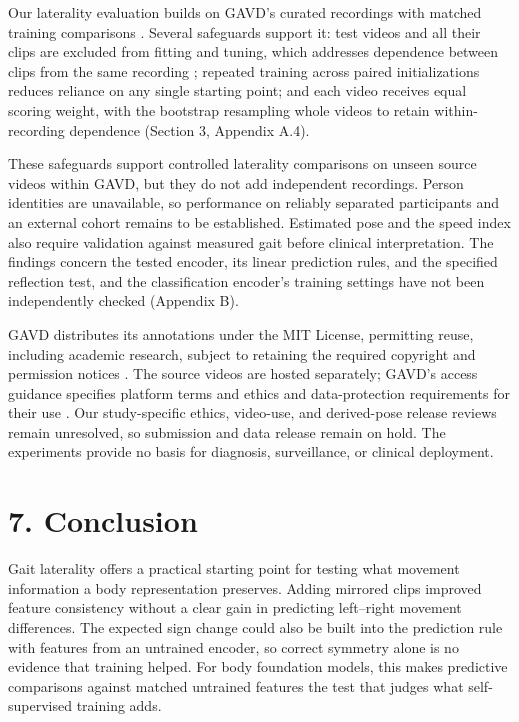 \documentclass{article}
\begin{document}
Our laterality evaluation builds on GAVD's curated recordings with
matched training comparisons \citep{ranjan2025gavd}. Several safeguards
support it: test videos and all their clips are excluded from fitting
and tuning, which addresses dependence between clips from the same
recording \citep{roberts2017crossvalidation}; repeated training across
paired initializations reduces reliance on any single starting point;
and each video receives equal scoring weight, with the bootstrap
resampling whole videos to retain within-recording dependence (Section
3, Appendix A.4).

These safeguards support controlled laterality comparisons on unseen
source videos within GAVD, but they do not add independent recordings.
Person identities are unavailable, so performance on reliably separated
participants and an external cohort remains to be established. Estimated
pose and the speed index also require validation against measured gait
before clinical interpretation. The findings concern the tested encoder,
its linear prediction rules, and the specified reflection test, and the
classification encoder's training settings have not been independently
checked (Appendix B).

GAVD distributes its annotations under the MIT License, permitting
reuse, including academic research, subject to retaining the required
copyright and permission notices \citep{gavdMIT2026}. The source videos
are hosted separately; GAVD's access guidance specifies platform terms
and ethics and data-protection requirements for their use
\citep{gavdRepo2026}. Our study-specific ethics, video-use, and
derived-pose release reviews remain unresolved, so submission and data
release remain on hold. The experiments provide no basis for diagnosis,
surveillance, or clinical deployment.

\section{7. Conclusion}\label{conclusion}

Gait laterality offers a practical starting point for testing what
movement information a body representation preserves. Adding mirrored
clips improved feature consistency without a clear gain in predicting
left--right movement differences. The expected sign change could also be
built into the prediction rule with features from an untrained encoder,
so correct symmetry alone is no evidence that training helped. For body
foundation models, this makes predictive comparisons against matched
untrained features the test that judges what self-supervised training
adds.
\end{document}
